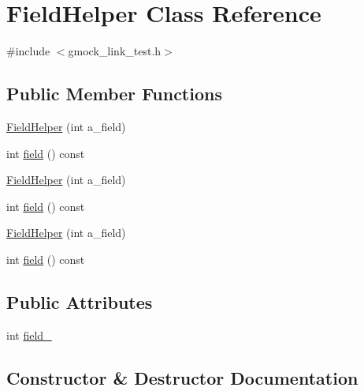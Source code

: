 \hypertarget{class_field_helper}{}\section{Field\+Helper Class Reference}
\label{class_field_helper}


{\ttfamily \#include $<$gmock\+\_\+link\+\_\+test.\+h$>$}

\subsection*{Public Member Functions}
\begin{DoxyCompactItemize}
\item 
\mbox{\hyperlink{class_field_helper_a06729cbd5da2993e8007cb62f1d00b3a}{Field\+Helper}} (int a\+\_\+field)
\item 
int \mbox{\hyperlink{class_field_helper_af2959e142813205aeeb4d2ad27430ad3}{field}} () const
\item 
\mbox{\hyperlink{class_field_helper_a06729cbd5da2993e8007cb62f1d00b3a}{Field\+Helper}} (int a\+\_\+field)
\item 
int \mbox{\hyperlink{class_field_helper_af2959e142813205aeeb4d2ad27430ad3}{field}} () const
\item 
\mbox{\hyperlink{class_field_helper_a06729cbd5da2993e8007cb62f1d00b3a}{Field\+Helper}} (int a\+\_\+field)
\item 
int \mbox{\hyperlink{class_field_helper_af2959e142813205aeeb4d2ad27430ad3}{field}} () const
\end{DoxyCompactItemize}
\subsection*{Public Attributes}
\begin{DoxyCompactItemize}
\item 
int \mbox{\hyperlink{class_field_helper_a50a7ec9efc60377363d5ce8bea1708ac}{field\+\_\+}}
\end{DoxyCompactItemize}


\subsection{Constructor \& Destructor Documentation}
\mbox{\label{class_field_helper_a06729cbd5da2993e8007cb62f1d00b3a}} 
